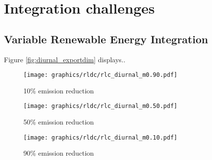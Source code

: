 
\section{Integration challenges}

\subsection{Variable Renewable Energy Integration}

Figure \ref{fig:diurnal_exportdim} displays..

\begin{figure*}[h] %
    \centering
    \begin{subfigure}[b]{0.3\linewidth}
        \centering
        \texttt{[image: graphics/rldc/rlc\_diurnal\_m0.90.pdf]}
        \caption{10\% emission reduction}
        \label{fig:diurnal_10emred}
    \end{subfigure}
    \hfill
    \begin{subfigure}[b]{0.3\linewidth}
        \centering
        \texttt{[image: graphics/rldc/rlc\_diurnal\_m0.50.pdf]}
        \caption{50\% emission reduction}
        \label{fig:diurnal_50emred}
    \end{subfigure}
    \hfill
    \begin{subfigure}[b]{0.3\linewidth}
        \centering
        \texttt{[image: graphics/rldc/rlc\_diurnal\_m0.10.pdf]}
        \caption{90\% emission reduction}
        \label{fig:diurnal_90emred}
    \end{subfigure}
    \hfill
    \caption{Export dependent (0 - 200 TWh) residual load curves with various integration options. Each row represents different integration strategies (RLC without integration, RLC with curtailment, RLC with curtailment and electrolyser load).
    Each column represents different climate ambitions (10 - 90\% emission reduction)}
    \label{fig:diurnal_exportdim}
\end{figure*}